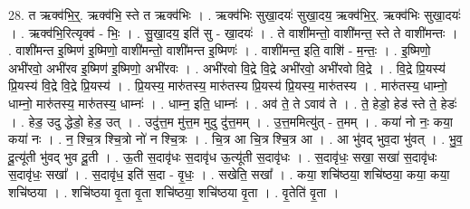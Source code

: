 \documentclass[17pt]{extarticle}
\begin{document}
28. त ऋक्व॑भि॒र्॒. ऋक्व॑भि॒ स्ते त ऋक्व॑भिः । . ऋक्व॑भिः सुखा॒दयः॑ सुखा॒दय॒ ऋक्व॑भि॒र्॒. ऋक्व॑भिः सुखा॒दयः॑ । . ऋक्व॑भि॒रित्यृक्व॑ - भिः॒ । . सु॒खा॒दय॒ इति॑ सु - खा॒दयः॑ । . ते वाशी॑मन्तो॒ वाशी॑मन्त॒ स्ते ते वाशी॑मन्तः । . वाशी॑मन्त इ॒ष्मिण॑ इ॒ष्मिणो॒ वाशी॑मन्तो॒ वाशी॑मन्त इ॒ष्मिणः॑ । . वाशी॑मन्त॒ इति॒ वाशि॑ - म॒न्तः॒ । . इ॒ष्मिणो॒ अभी॑रवो॒ अभी॑रव इ॒ष्मिण॑ इ॒ष्मिणो॒ अभी॑रवः । . अभी॑रवो वि॒द्रे वि॒द्रे अभी॑रवो॒ अभी॑रवो वि॒द्रे । . वि॒द्रे प्रि॒यस्य॑ प्रि॒यस्य॑ वि॒द्रे वि॒द्रे प्रि॒यस्य॑ । . प्रि॒यस्य॒ मारु॑तस्य॒ मारु॑तस्य प्रि॒यस्य॑ प्रि॒यस्य॒ मारु॑तस्य । . मारु॑तस्य॒ धाम्नो॒ धाम्नो॒ मारु॑तस्य॒ मारु॑तस्य॒ धाम्नः॑ । . धाम्न॒ इति॒ धाम्नः॑ । . अव॑ ते॒ ते ऽवाव॑ ते । . ते॒ हेडो॒ हेड॑ स्ते ते॒ हेडः॑ । . हेड॒ उदु द्धेडो॒ हेड॒ उत् । . उदु॑त्त॒म मु॑त्त॒म मुदु दु॑त्त॒मम् । . उ॒त्त॒ममित्यु॑त् - त॒मम् । . कया॑ नो नः॒ कया॒ कया॑ नः । . न॒ श्चि॒त्र श्चि॒त्रो नो॑ न श्चि॒त्रः । . चि॒त्र आ चि॒त्र श्चि॒त्र आ । . आ भु॑वद् भुव॒दा भु॑वत् । . भु॒व॒ दू॒त्यू॑ती भु॑वद् भुव दू॒ती । . ऊ॒ती स॒दावृ॑धः स॒दावृ॑ध ऊ॒त्यू॑ती स॒दावृ॑धः । . स॒दावृ॑धः॒ सखा॒ सखा॑ स॒दावृ॑धः स॒दावृ॑धः॒ सखा᳚ । . स॒दावृ॑ध॒ इति॑ स॒दा - वृ॒धः॒ । . सखेति॒ सखा᳚ । . कया॒ शचि॑ष्ठया॒ शचि॑ष्ठया॒ कया॒ कया॒ शचि॑ष्ठया । . शचि॑ष्ठया वृ॒ता वृ॒ता शचि॑ष्ठया॒ शचि॑ष्ठया वृ॒ता । . वृ॒तेति॑ वृ॒ता । \newline
\end{document}
